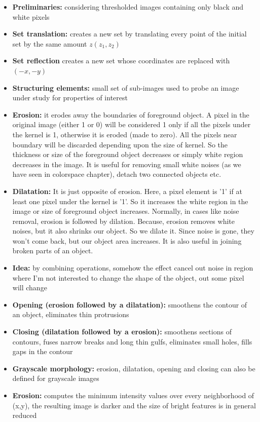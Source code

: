 \documentclass{article}
\begin{document}
\begin{itemize}
    \item \textbf{Preliminaries:} considering thresholded images containing only black and white pixels
    \item \textbf{Set translation:} creates a new set by translating every point of the initial set by the same amount \(z(z_1,z_2)\)
    \item \textbf{Set reflection} creates a new set whose coordinates are replaced with \((-x, -y)\)
    \item \textbf{Structuring elements:} small set of sub-images used to probe an image under study for properties of interest
    \item \textbf{Erosion:} it erodes away the boundaries of foreground object. A pixel in the original image (either 1 or 0) will be considered 1 only if all the pixels under the kernel is 1, otherwise it is eroded (made to zero). All the pixels near boundary will be discarded depending upon the size of kernel. So the thickness or size of the foreground object decreases or simply white region decreases in the image. It is useful for removing small white noises (as we have seen in colorspace chapter), detach two connected objects etc.
    \item \textbf{Dilatation:} It is just opposite of erosion. Here, a pixel element is '1' if at least one pixel under the kernel is '1'. So it increases the white region in the image or size of foreground object increases. Normally, in cases like noise removal, erosion is followed by dilation. Because, erosion removes white noises, but it also shrinks our object. So we dilate it. Since noise is gone, they won't come back, but our object area increases. It is also useful in joining broken parts of an object.
    \item \textbf{Idea:} by combining operations, somehow the effect cancel out noise in region where I'm not interested to change the shape of the object, out some pixel will change
    \item \textbf{Opening (erosion followed by a dilatation):} smoothens the contour of an object, eliminates thin protrusions
    \item \textbf{Closing (dilatation followed by a erosion):} smoothens sections of contours, fuses narrow breaks and long thin gulfs, eliminates small holes, fills gaps in the contour
    \item \textbf{Grayscale morphology:} erosion, dilatation, opening and closing can also be defined for grayscale images
    \item \textbf{Erosion:} computes the minimum intensity values over every neighborhood of (x,y), the resulting image is darker and the size of bright features is in general reduced

\end{itemize}
\end{document}
